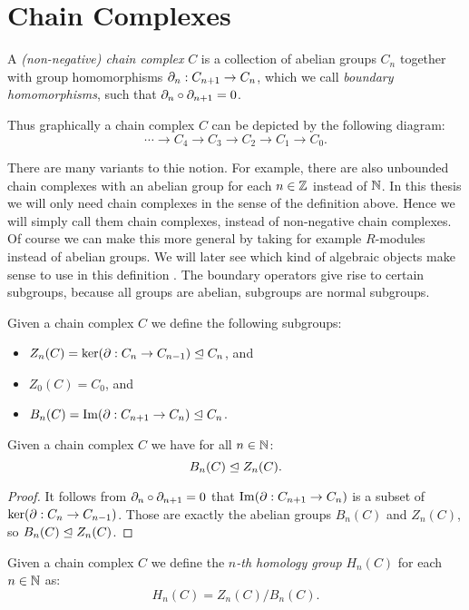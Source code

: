 \section{Chain Complexes}
\label{sec:Chain Complexes}
\begin{definition}
	A \emph{(non-negative) chain complex} $C$ is a collection of abelian groups $C_n$ together with group homomorphisms $\partial_n: C_{n+1} \to C_n$, which we call \emph{boundary homomorphisms}, such that $\partial_n \circ \partial_{n+1} = 0$.
\end{definition}

Thus graphically a chain complex $C$ can be depicted by the following diagram:
$$ \cdots \to C_4 \to C_3 \to C_2 \to C_1 \to C_0. $$

There are many variants to thie notion. For example, there are also unbounded chain complexes with an abelian group for each $n \in \mathbb{Z}$ instead of $\mathbb{N}$. In this thesis we will only need chain complexes in the sense of the definition above. Hence we will simply call them chain complexes, instead of non-negative chain complexes.
Of course we can make this more general by taking for example $R$-modules instead of abelian groups. We will later see which kind of algebraic objects make sense to use in this definition . The boundary operators give rise to certain subgroups, because all groups are abelian, subgroups are normal subgroups.

\begin{definition}
	Given a chain complex $C$ we define the following subgroups:
	\begin{itemize}
		\item $Z_n(C) = \ker(\partial: C_n \to C_{n-1}) \trianglelefteq C_n$, and
		\item $Z_0(C) = C_0$, and
		\item $B_n(C) = \operatorname{Im}(\partial: C_{n+1} \to C_n) \trianglelefteq C_n$.
	\end{itemize}
\end{definition}
\begin{lemma}
	Given a chain complex $C$ we have for all $n \in \mathbb{N}$:
	$$ B_n(C) \trianglelefteq Z_n(C).$$
\end{lemma}
\begin{proof}
	It follows from $\partial_n \circ \partial_{n+1} = 0$ that $\operatorname{Im}(\partial: C_{n+1} \to C_n)$ is a subset of $\ker(\partial: C_n \to C_{n-1})$. Those are exactly the abelian groups $B_n(C)$ and $Z_n(C)$, so $ B_n(C) \trianglelefteq Z_n(C) $.
\end{proof}
\begin{definition}
	Given a chain complex $C$ we define the \emph{$n$-th homology group} $H_n(C)$ for each $n \in \mathbb{N}$ as:
	$$ H_n(C) = Z_n(C) / B_n(C).$$
\end{definition}

